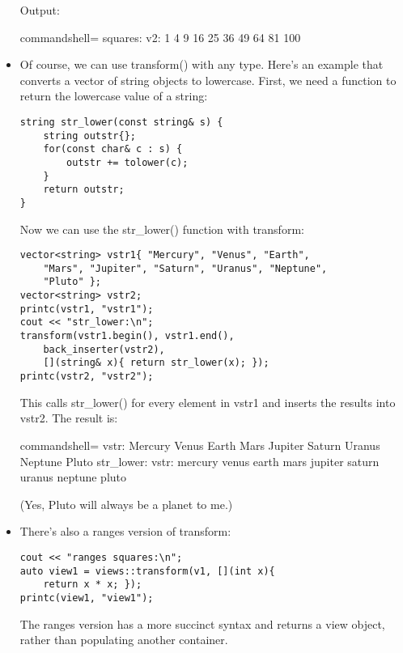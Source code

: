 \begin{itemize}
Output:

\begin{tcblisting}{commandshell={}}
squares:
v2: 1 4 9 16 25 36 49 64 81 100
\end{tcblisting}

\item 
Of course, we can use transform() with any type. Here's an example that converts a vector of string objects to lowercase. First, we need a function to return the lowercase value of a string:

\begin{lstlisting}[style=styleCXX]
string str_lower(const string& s) {
	string outstr{};
	for(const char& c : s) {
		outstr += tolower(c);
	}
	return outstr;
}
\end{lstlisting}

Now we can use the str\_lower() function with transform:

\begin{lstlisting}[style=styleCXX]
vector<string> vstr1{ "Mercury", "Venus", "Earth",
	"Mars", "Jupiter", "Saturn", "Uranus", "Neptune",
	"Pluto" };
vector<string> vstr2;
printc(vstr1, "vstr1");
cout << "str_lower:\n";
transform(vstr1.begin(), vstr1.end(),
	back_inserter(vstr2),
	[](string& x){ return str_lower(x); });
printc(vstr2, "vstr2");
\end{lstlisting}

This calls str\_lower() for every element in vstr1 and inserts the results into vstr2. The result is:

\begin{tcblisting}{commandshell={}}
vstr: Mercury Venus Earth Mars Jupiter Saturn Uranus
Neptune Pluto
str_lower:
vstr: mercury venus earth mars jupiter saturn uranus
neptune pluto
\end{tcblisting}

(Yes, Pluto will always be a planet to me.)

\item 
There's also a ranges version of transform:

\begin{lstlisting}[style=styleCXX]
cout << "ranges squares:\n";
auto view1 = views::transform(v1, [](int x){
	return x * x; });
printc(view1, "view1");
\end{lstlisting}

The ranges version has a more succinct syntax and returns a view object, rather than populating another container.
\end{itemize}

